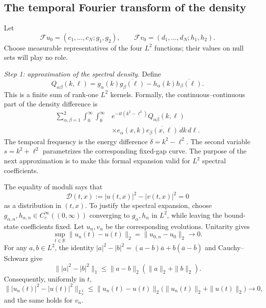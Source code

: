 \documentclass[11pt]{amsart}
\numberwithin{equation}{section}
\theoremstyle{remark}
\newcommand{\R}{\mathbb R}
\begin{document}
\subsection{The temporal Fourier transform of the density}

Let
\[
 \mathcal Fu_0=(c_1,\ldots,c_N;g_1,g_2),
 \qquad
 \mathcal Fv_0=(d_1,\ldots,d_N;h_1,h_2).
\]
Choose measurable representatives of the four $L^2$ functions; their values
on null sets will play no role.

\smallskip
\noindent
\emph{Step 1: approximation of the spectral density.}
Define
\begin{equation}
 Q_{\alpha\beta}(k,\ell)
 =g_\alpha(k)\overline{g_\beta(\ell)}
  -h_\alpha(k)\overline{h_\beta(\ell)}.
 \label{eq:ac-kernel-difference}
\end{equation}
This is a finite sum of rank-one $L^2$ kernels.  Formally, the
continuous--continuous part of the density difference is
\begin{align}
 \sum_{\alpha,\beta=1}^2\int_0^\infty\int_0^\infty
 &e^{-it(k^2-\ell^2)}Q_{\alpha\beta}(k,\ell)\\
 &\times e_\alpha(x,k)\overline{e_\beta(x,\ell)}\,dk\,d\ell.
 \label{eq:formal-cc-density}
\end{align}
The temporal frequency is the energy difference
$\delta=k^2-\ell^2$.  The second variable
$s=k^2+\ell^2$ parametrizes the corresponding fixed-gap curve.  The purpose
of the next approximation is to make this formal expansion valid for
$L^2$ spectral coefficients.

The equality of moduli says that
\begin{equation}
 \mathcal D(t,x):=|u(t,x)|^2-|v(t,x)|^2=0
 \label{eq:density-difference}
\end{equation}
as a distribution in $(t,x)$.  To justify the spectral expansion, choose
$g_{\alpha,n},h_{\alpha,n}\in C_c^\infty((0,\infty))$ converging to
$g_\alpha,h_\alpha$ in $L^2$, while leaving the bound-state coefficients
fixed.  Let $u_n,v_n$ be the corresponding evolutions.  Unitarity gives
\[
 \sup_{t\in\R}\|u_n(t)-u(t)\|_2=\|u_{0,n}-u_0\|_2\longrightarrow0.
\]
For any $a,b\in L^2$, the identity
$|a|^2-|b|^2=(a-b)\overline a+b(\overline a-\overline b)$ and
Cauchy--Schwarz give
\[
 \||a|^2-|b|^2\|_1\le\|a-b\|_2(\|a\|_2+\|b\|_2).
\]
Consequently, uniformly in $t$,
\begin{equation}
 \bigl\||u_n(t)|^2-|u(t)|^2\bigr\|_{L^1_x}
 \le
 \|u_n(t)-u(t)\|_2\bigl(\|u_n(t)\|_2+\|u(t)\|_2\bigr)
 \longrightarrow0,
 \label{eq:density-approximation}
\end{equation}
and the same holds for $v_n$.
\end{document}
